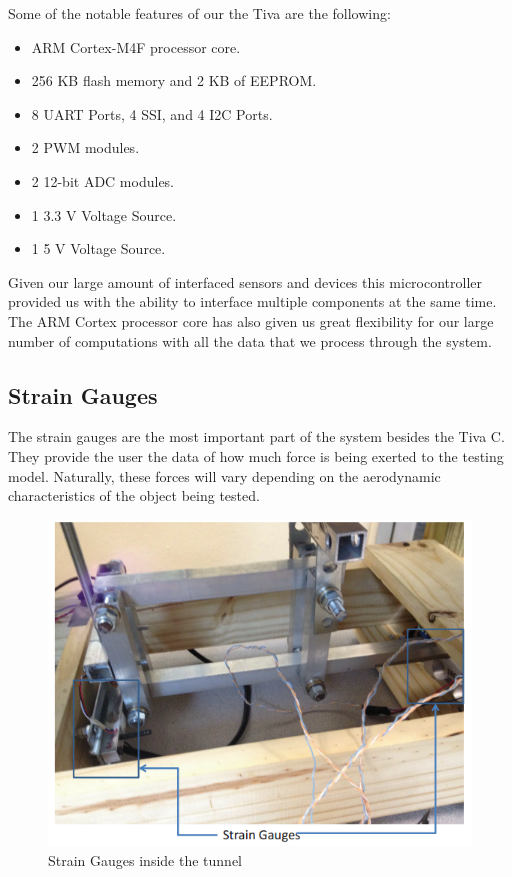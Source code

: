 		Some of the notable features of our the Tiva are the following:
		
		\begin{itemize}
		 \item ARM Cortex-M4F processor core.
		 \item 256 KB flash memory and 2 KB of EEPROM.
 		 \item 8 UART Ports, 4 SSI, and 4 I2C Ports.
 		 \item 2 PWM modules.
 		 \item 2 12-bit ADC modules.
 		 \item 1 3.3 V Voltage Source.
 		 \item 1 5 V Voltage Source.
        \end{itemize}
        
        Given our large amount of interfaced sensors and devices this microcontroller provided us with the ability to interface multiple components at the same time. The ARM Cortex processor core has also given us great flexibility for our large number of computations with all the data that we process through the system.
		
		
		\subsection{Strain Gauges}
		
		The strain gauges are the most important part of the system besides the Tiva C. They provide the user the data of how much force is being exerted to the testing model. Naturally, these forces will vary depending on the aerodynamic characteristics of the object being tested. \\
		
		\begin{figure}[H]
			\centering
				\includegraphics[scale=0.7]{img/Capture}
			\caption{Strain Gauges inside the tunnel}
		\end{figure}
		
